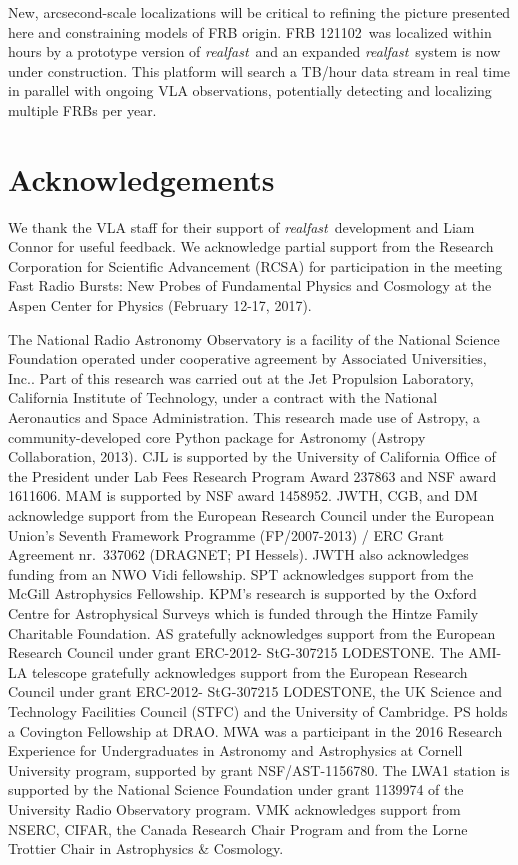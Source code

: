 \documentclass[twocolumn]{aastex61}
\newcommand{\rf}{\emph{realfast}}
\newcommand{\frb}{FRB 121102}
\begin{document}
New, arcsecond-scale localizations will be critical to refining the picture presented here and constraining models of FRB origin. \frb\ was localized within hours by a prototype version of \rf\ and an expanded \rf\ system is now under construction. This platform will search a TB/hour data stream in real time in parallel with ongoing VLA observations, potentially detecting and localizing multiple FRBs per year.

%


\section*{Acknowledgements}
We thank the VLA staff for their support of \rf\ development and Liam Connor for useful feedback. We acknowledge partial support from the Research Corporation for Scientific Advancement (RCSA) for participation in the meeting Fast Radio Bursts: New Probes of Fundamental Physics and Cosmology at the Aspen Center for Physics (February 12-17, 2017).

The National Radio Astronomy Observatory is a facility of the National Science Foundation operated under cooperative agreement by Associated Universities, Inc..
Part of this research was carried out at the Jet Propulsion Laboratory, California Institute of Technology, under a contract with the National Aeronautics and Space Administration.
This research made use of Astropy, a community-developed core Python package for Astronomy (Astropy Collaboration, 2013).
CJL is supported by the University of California Office of the President under Lab Fees Research Program Award 237863 and NSF award 1611606. MAM is supported by NSF award 1458952. 
JWTH, CGB, and DM acknowledge support from the European Research Council under the European Union's Seventh Framework Programme (FP/2007-2013) / ERC Grant Agreement nr.\ 337062 (DRAGNET; PI Hessels). JWTH also acknowledges funding from an NWO Vidi fellowship.
SPT acknowledges support from the McGill Astrophysics Fellowship.
KPM's research is supported by the Oxford Centre for Astrophysical Surveys which is funded through the Hintze Family Charitable Foundation. AS gratefully acknowledges support from the European Research Council under grant ERC-2012- StG-307215 LODESTONE. The AMI-LA telescope gratefully acknowledges support from the European Research Council under grant ERC-2012- StG-307215 LODESTONE, the UK Science and Technology Facilities Council (STFC) and the University of Cambridge. 
PS holds a Covington Fellowship at DRAO. 
MWA was a participant in the 2016 Research Experience for Undergraduates in Astronomy and Astrophysics at Cornell University program, supported by grant NSF/AST-1156780.
The LWA1 station is supported by the National Science Foundation under grant 1139974 of the University Radio Observatory program.
VMK acknowledges support from NSERC, CIFAR, the Canada Research Chair Program and from the Lorne Trottier Chair in Astrophysics \& Cosmology.




\end{document}

